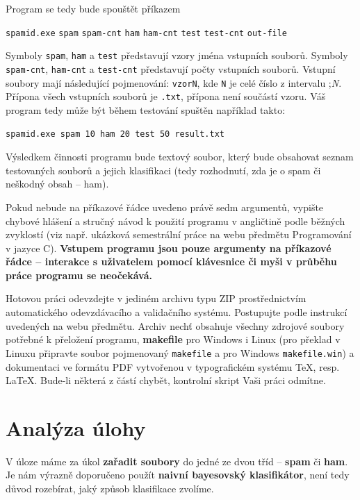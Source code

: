 \documentclass[12pt]{report}
\newcommand\la{\textlangle}  					%
\newcommand\ra{\textrangle}						%
\newcommand\laratexttt[1]{\la\texttt{#1}\ra}	%
\newcommand\indentt[1]{						
	\setlength\parindent{5mm}
	#1
	\setlength\parindent{0mm}
	}											%
\begin{document}
	Program se tedy bude spouštět příkazem
	
	\indentt{\texttt{spamid.exe} \laratexttt{spam} \laratexttt{spam-cnt} \laratexttt{ham} \laratexttt{ham-cnt} \laratexttt{test} \laratexttt{test-cnt} \laratexttt{out-file}$\,$\keys{\return}}
	
	Symboly \laratexttt{spam}, \laratexttt{ham} a \laratexttt{test} představují vzory jména vstupních souborů. Symboly \laratexttt{spam-cnt}, \laratexttt{ham-cnt} a \laratexttt{test-cnt} představují počty vstupních souborů. Vstupní soubory mají následující pojmenování: \texttt{vzorN}, kde \texttt{N} je celé číslo z intervalu \la1;\textit{N}\ra. Přípona všech vstupních souborů je \texttt{.txt}, přípona není součástí vzoru. Váš program tedy může být během testování spuštěn například takto:
	
	\indentt{
	\texttt{spamid.exe spam 10 ham 20 test 50 result.txt}$\,$\keys{\return}
	}
	
	Výsledkem činnosti programu bude textový soubor, který bude obsahovat seznam testovaných souborů a jejich klasifikaci (tedy rozhodnutí, zda je o spam či neškodný obsah – ham).
	
	Pokud nebude na příkazové řádce uvedeno právě sedm argumentů, vypište chybové hlášení a stručný návod k použití programu v angličtině podle běžných zvyklostí (viz např. ukázková semestrální práce na webu předmětu Programování v jazyce C). \textbf{Vstupem programu jsou pouze argumenty na příkazové řádce – interakce s uživatelem pomocí klávesnice či myši v průběhu práce programu se neočekává.}
	
	Hotovou práci odevzdejte v jediném archivu typu ZIP prostřednictvím automatického odevzdávacího a validačního systému. Postupujte podle instrukcí uvedených na webu předmětu. Archiv nechť obsahuje všechny zdrojové soubory potřebné k přeložení programu, \textbf{makefile} pro Windows i Linux (pro překlad v Linuxu připravte soubor pojmenovaný \texttt{makefile} a pro Windows \texttt{makefile.win}) a dokumentaci ve formátu PDF vytvořenou v typografickém systému \TeX, resp. \LaTeX. Bude-li některá z částí chybět, kontrolní skript Vaši práci odmítne.

	\chapter{Analýza úlohy}
	V úloze máme za úkol \textbf{zařadit soubory} do jedné ze dvou tříd – \textbf{spam} či \textbf{ham}. Je nám výrazně doporučeno použít \textbf{naivní bayesovský klasifikátor}, není tedy důvod rozebírat, jaký způsob klasifikace zvolíme.
	
\end{document}
